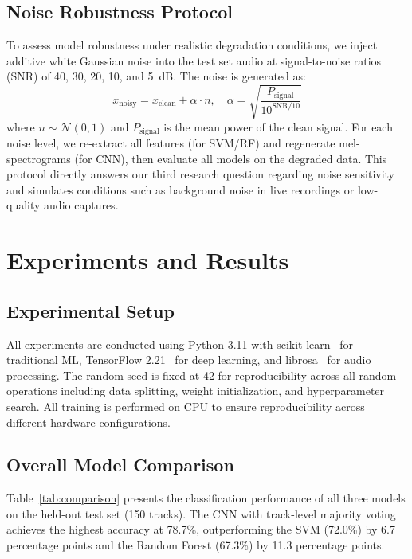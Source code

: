 \documentclass[10pt,journal]{IEEEtran}
\begin{document}
\subsection{Noise Robustness Protocol}

To assess model robustness under realistic degradation conditions, we inject additive white Gaussian noise into the test set audio at signal-to-noise ratios (SNR) of 40, 30, 20, 10, and 5~dB. The noise is generated as:
\begin{equation}
x_{\text{noisy}} = x_{\text{clean}} + \alpha \cdot n, \quad \alpha = \sqrt{\frac{P_{\text{signal}}}{10^{\text{SNR}/10}}}
\end{equation}
where $n \sim \mathcal{N}(0, 1)$ and $P_{\text{signal}}$ is the mean power of the clean signal. For each noise level, we re-extract all features (for SVM/RF) and regenerate mel-spectrograms (for CNN), then evaluate all models on the degraded data. This protocol directly answers our third research question regarding noise sensitivity and simulates conditions such as background noise in live recordings or low-quality audio captures.

\section{Experiments and Results}

\subsection{Experimental Setup}

All experiments are conducted using Python 3.11 with scikit-learn~\cite{pedregosa2011scikit} for traditional ML, TensorFlow 2.21~\cite{tensorflow2015} for deep learning, and librosa~\cite{mcfee2015librosa} for audio processing. The random seed is fixed at 42 for reproducibility across all random operations including data splitting, weight initialization, and hyperparameter search. All training is performed on CPU to ensure reproducibility across different hardware configurations.

\subsection{Overall Model Comparison}

Table~\ref{tab:comparison} presents the classification performance of all three models on the held-out test set (150 tracks). The CNN with track-level majority voting achieves the highest accuracy at 78.7\%, outperforming the SVM (72.0\%) by 6.7 percentage points and the Random Forest (67.3\%) by 11.3 percentage points.
\end{document}
